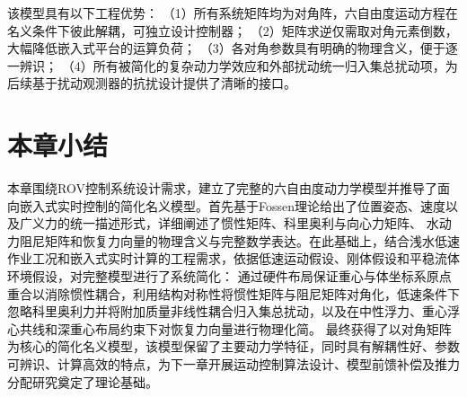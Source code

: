 该模型具有以下工程优势：
（1）所有系统矩阵均为对角阵，六自由度运动方程在名义条件下彼此解耦，可独立设计控制器；
（2）矩阵求逆仅需取对角元素倒数，大幅降低嵌入式平台的运算负荷；
（3）各对角参数具有明确的物理含义，便于逐一辨识；
（4）所有被简化的复杂动力学效应和外部扰动统一归入集总扰动项，为后续基于扰动观测器的抗扰设计提供了清晰的接口。

\section{本章小结}

本章围绕ROV控制系统设计需求，建立了完整的六自由度动力学模型并推导了面向嵌入式实时控制的简化名义模型。首先基于Fossen理论给出了位置姿态、速度以及广义力的统一描述形式，详细阐述了惯性矩阵、科里奥利与向心力矩阵、
水动力阻尼矩阵和恢复力向量的物理含义与完整数学表达。在此基础上，结合浅水低速作业工况和嵌入式实时计算的工程需求，依据低速运动假设、刚体假设和平稳流体环境假设，对完整模型进行了系统简化：
通过硬件布局保证重心与体坐标系原点重合以消除惯性耦合，利用结构对称性将惯性矩阵与阻尼矩阵对角化，低速条件下忽略科里奥利力并将附加质量非线性耦合归入集总扰动，以及在中性浮力、重心浮心共线和深重心布局约束下对恢复力向量进行物理化简。
最终获得了以对角矩阵为核心的简化名义模型，该模型保留了主要动力学特征，同时具有解耦性好、参数可辨识、计算高效的特点，为下一章开展运动控制算法设计、模型前馈补偿及推力分配研究奠定了理论基础。
